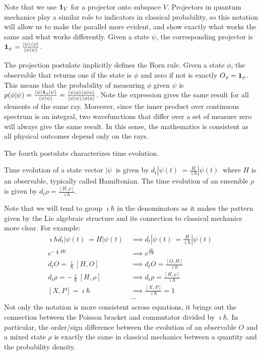 Note that we use $\indicator[V]$ for a projector onto subspace $V$. Projectors in quantum mechanics play a similar role to indicators in classical probability, so this notation will allow us to make the parallel more evident, and show exactly what works the same and what works differently. Given a state $\psi$, the corresponding projector is $\indicator[\psi] = \frac{| \psi \> \<\psi |}{\<\psi | \psi \>}$.

The projection postulate implicitly defines the Born rule. Given a state $\phi$, the observable that returns one if the state is $\phi$ and zero if not is exactly $O_{\phi} = \indicator[\phi]$. This means that the probability of measuring $\phi$ given $\psi$ is $p(\phi | \psi) = \frac{\<\psi | \indicator[\phi] | \psi \>}{\<\psi | \psi \>} = \frac{\<\psi | \phi \> \<\phi | \psi \>}{\<\psi | \psi \>\<\phi | \phi \>}$. Note the expression gives the same result for all elements of the same ray. Moreover, since the inner product over continuous spectrum is an integral, two wavefunctions that differ over a set of measure zero will always give the same result. In this sense, the mathematics is consistent as all physical outcomes depend only on the rays.

The fourth postulate characterizes time evolution.
\renewcommand{\thepostulate}{UNIT}
\begin{postulate}\label{rp_qm_postUnitEvol}
	Time evolution of a state vector $|\psi\>$ is given by $d_t |\psi(t)\> = \frac{H}{\imath \hbar} |\psi(t)\>$ where $H$ is an observable, typically called Hamiltonian. The time evolution of an ensemble $\rho$ is given by $d_t \rho = \frac{\left[H, \rho\right]}{\imath\hbar}$.
\end{postulate}
\renewcommand{\thepostulate}{\Roman{assump}}

Note that we will tend to group $\imath \hbar$ in the denominators as it makes the pattern given by the Lie algebraic structure and its connection to classical mechanics more clear. For example:
\begin{equation}
	\begin{aligned}
	\imath \hbar d_t |\psi(t)\> = H |\psi(t)\> & \implies d_t |\psi(t)\> = \frac{H}{\imath \hbar} |\psi(t)\> \\
e^{- \frac{\imath}{\hbar} H t} &\implies e^{\frac{H t}{\imath \hbar}} \\
d_t O = \frac{\imath}{\hbar} [H, O] &\implies d_t O = \frac{[O,H]}{\imath\hbar}\\
d_t \rho = - \frac{\imath}{\hbar} [H, \rho] &\implies d_t \rho = \frac{[H,\rho]}{\imath\hbar}\\
[X,P] = \imath\hbar &\implies \frac{[X,P]}{\imath \hbar} = 1 \\
&\cdots
	\end{aligned}
\end{equation}
Not only the notation is more consistent across equations, it brings out the connection between the Poisson bracket and commutator divided by $\imath\hbar$. In particular, the order/sign difference between the evolution of an observable $O$ and a mixed state $\rho$ is exactly the same in classical mechanics between a quantity and the probability density.

